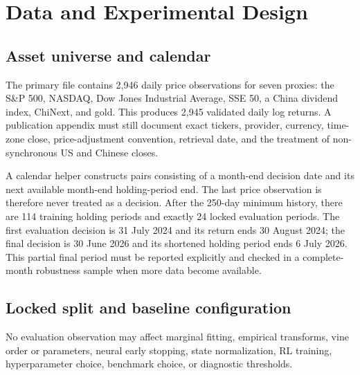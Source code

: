 \section{Data and Experimental Design}
\label{sec:data}

\subsection{Asset universe and calendar}

The primary file contains 2,946 daily price observations for seven proxies:
the S\&P 500, NASDAQ, Dow Jones Industrial Average, SSE 50, a China dividend
index, ChiNext, and gold. This produces 2,945 validated daily log returns.
A publication appendix must still document exact tickers, provider, currency,
time-zone close, price-adjustment convention, retrieval date, and the treatment
of non-synchronous US and Chinese closes.

A calendar helper constructs pairs consisting of a month-end decision date and
its next available month-end holding-period end. The last price observation is
therefore never treated as a decision. After the 250-day minimum history, there
are 114 training holding periods and exactly 24 locked evaluation periods. The
first evaluation decision is 31 July 2024 and its return ends 30 August 2024;
the final decision is 30 June 2026 and its shortened holding period ends
6 July 2026. This partial final period must be reported explicitly and checked
in a complete-month robustness sample when more data become available.

\subsection{Locked split and baseline configuration}

No evaluation observation may affect marginal fitting, empirical transforms,
vine order or parameters, neural early stopping, state normalization, RL
training, hyperparameter choice, benchmark choice, or diagnostic thresholds.

